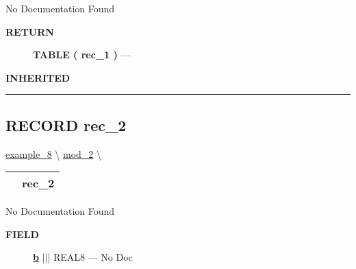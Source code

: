No Documentation Found








\par
\begin{description}
\item [\colorbox{tagtype}{\color{white} \textbf{\textsf{RETURN}}}] \textbf{TABLE ( rec\_1 )} --- 
\end{description}






\par
\begin{description}
\item [\colorbox{tagtype}{\color{white} \textbf{\textsf{INHERITED}}}] 
\end{description}



\rule{\linewidth}{0.5pt}
\subsection*{\textsf{\colorbox{headtoc}{\color{white} RECORD}
rec\_2}}

\hypertarget{ecldoc:intest.in1intest.example_8.mod_2.rec_2}{}
\hspace{0pt} \hyperlink{ecldoc:intest.in1intest.example_8}{example_8} \textbackslash 
\hspace{0pt} \hyperlink{ecldoc:intest.in1intest.example_8.mod_2}{mod_2} \textbackslash 

{\renewcommand{\arraystretch}{1.5}
\begin{tabularx}{\textwidth}{|>{\raggedright\arraybackslash}l|X|}
\hline
\hspace{0pt}\mytexttt{\color{red} } & \textbf{rec\_2} \\
\hline
\end{tabularx}
}

\par





No Documentation Found







\par
\begin{description}
\item [\colorbox{tagtype}{\color{white} \textbf{\textsf{FIELD}}}] \textbf{\underline{b}} ||| REAL8 --- No Doc
\end{description}





